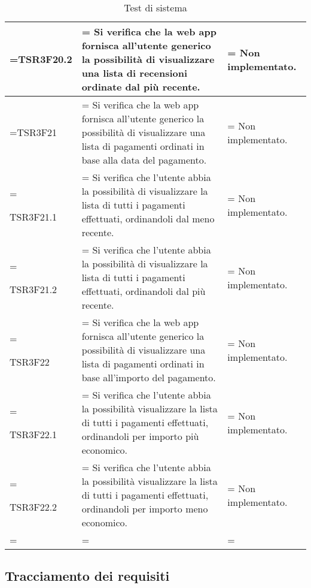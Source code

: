 \begin{xltabular}{\textwidth} {
            >{\hsize\linewidth=\hsize}X
            >{\hsize\linewidth=\hsize}X
            >{\hsize\linewidth=\hsize}X
        }
        TSR3F20.2 &
        Si verifica che la web app fornisca all'utente generico la possibilità di visualizzare una lista di recensioni ordinate dal più recente. &
        Non implementato. 
        \\ \hline

        TSR3F21 &
        Si verifica che la web app fornisca all'utente generico la possibilità di visualizzare una lista di pagamenti ordinati in base alla data del pagamento. &
        Non implementato. 
        \\ \hline

        TSR3F21.1 &
        Si verifica che l'utente abbia la possibilità di visualizzare la lista di tutti i pagamenti
        effettuati, ordinandoli dal meno recente. &
        Non implementato.
        \\ \hline

        TSR3F21.2 &
        Si verifica che l'utente abbia la possibilità di visualizzare la lista di tutti i pagamenti
        effettuati, ordinandoli dal più recente. &
        Non implementato.
        \\ \hline

        TSR3F22 &
        Si verifica che la web app fornisca all'utente generico la possibilità di visualizzare una lista di pagamenti ordinati in base all'importo del pagamento. &
        Non implementato. 
        \\ \hline

        TSR3F22.1 &
        Si verifica che l'utente abbia la possibilità visualizzare la lista di tutti i pagamenti
        effettuati, ordinandoli per importo più economico. &
        Non implementato.
        \\ \hline
        
        TSR3F22.2 &
        Si verifica che l'utente abbia la possibilità visualizzare la lista di tutti i pagamenti
        effettuati, ordinandoli per importo meno economico. &
        Non implementato.
        \\ \hline


        \caption{Test di sistema}
    \end{xltabular}

    \subsection{Tracciamento dei requisiti}

